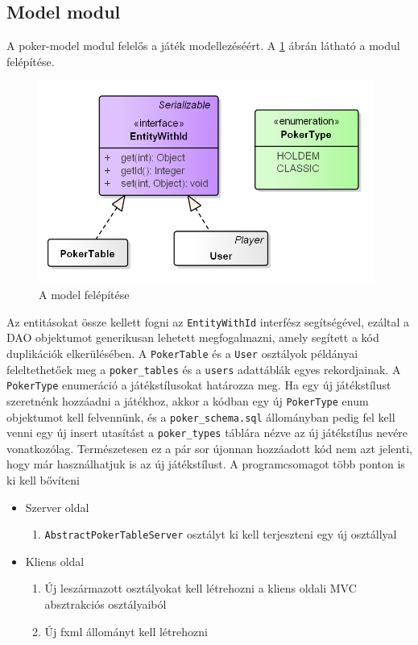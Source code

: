 \subsection{Model modul} \label{sec:poker-model}
A poker-model modul felelős a játék modellezéséért. A \ref{fig:model} ábrán látható a modul felépítése. 
\begin{figure}[h!]
	\caption{A model felépítése}
	\label{fig:model}
	\centering
	\includegraphics[width=11cm]{developer-documentation/images/model.png}
\end{figure}
Az entitásokat össze kellett fogni az \texttt{EntityWithId} interfész segítségével, ezáltal a DAO objektumot generikusan lehetett megfogalmazni, amely segített a kód duplikációk elkerülésében. A \texttt{PokerTable} és a \texttt{User} osztályok példányai feleltethetőek meg a \texttt{poker\_tables} és a \texttt{users} adattáblák egyes rekordjainak. A \texttt{PokerType} enumeráció a játékstílusokat határozza meg. Ha egy új játékstílust szeretnénk hozzáadni a játékhoz, akkor a kódban egy új \texttt{PokerType} enum objektumot kell felvennünk, és a \texttt{poker\_schema.sql} állományban pedig fel kell venni egy új insert utasítást a \texttt{poker\_types} táblára nézve az új játékstílus nevére vonatkozólag. Természetesen ez a pár sor újonnan hozzáadott kód nem azt jelenti, hogy már használhatjuk is az új játékstílust. A programcsomagot több ponton is ki kell bővíteni
\begin{itemize}[leftmargin=2cm]
	\item Szerver oldal
		\begin{enumerate}
			\item \texttt{AbstractPokerTableServer} osztályt ki kell terjeszteni egy új osztállyal
		\end{enumerate}
	\item Kliens oldal
		\begin{enumerate}
			\item Új leszármazott osztályokat kell létrehozni a kliens oldali MVC absztrakciós osztályaiból
			\item Új fxml állományt kell létrehozni
		\end{enumerate}
\end{itemize}

